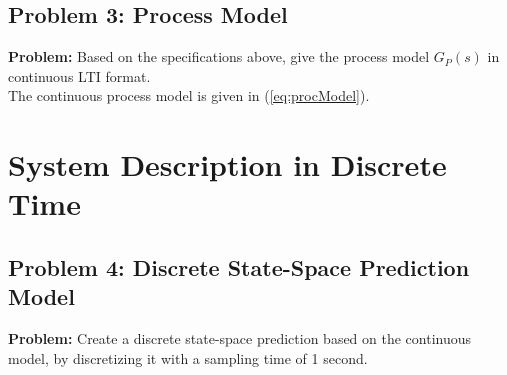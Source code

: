 \documentclass[12pt]{article}
\begin{document}
\subsection{Problem 3: Process Model}

\textbf{Problem:} Based on the specifications above, give the process model $G_P(s)$ in continuous LTI format. \\

The continuous process model is given in (\ref{eq:procModel}).

\section{System Description in Discrete Time}

\subsection{Problem 4: Discrete State-Space Prediction Model}

\textbf{Problem:} Create a discrete state-space prediction based on the continuous model, by discretizing it with a sampling time of 1 second. \\
\end{document}

